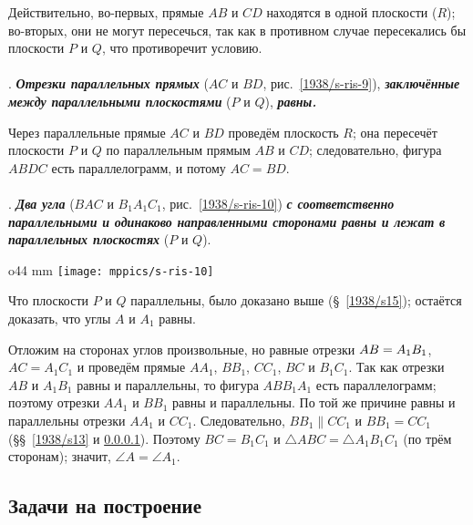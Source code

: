 Действительно, во-первых, прямые $AB$ и $CD$ находятся в одной плоскости ($R$);
во-вторых, они не могут пересечься, так как в противном случае пересекались бы плоскости $P$ и $Q$, что противоречит условию.


\paragraph{}\label{1938/s17} \mbox{.}
\textbf{\emph{Отрезки параллельных прямых}} ($AC$ и $BD$, рис.~\ref{1938/s-ris-9}), \textbf{\emph{заключённые между параллельными плоскостями}} ($P$ и $Q$), \textbf{\emph{равны.}}


Через параллельные прямые $AC$ и $BD$ проведём плоскость $R$;
она пересечёт плоскости $P$ и $Q$ по параллельным прямым $AB$ и $CD$;
следовательно, фигура $ABDC$ есть параллелограмм, и потому $AC = BD$.

\paragraph{}\label{1938/s18}
\mbox{.} \textbf{\emph{Два угла}} ($BAC$ и $B_1A_1C_1$, рис.~\ref{1938/s-ris-10}) \textbf{\emph{с соответственно параллельными и одинаково направленными сторонами равны и лежат в параллельных плоскостях}} ($P$ и $Q$).

\begin{wrapfigure}{o}{44 mm}
\centering
\texttt{[image: mppics/s-ris-10]}
\caption{}\label{1938/s-ris-10}
\end{wrapfigure}

Что плоскости $P$ и $Q$ параллельны, было доказано выше (§~\ref{1938/s15});
остаётся доказать, что углы $A$ и $A_1$ равны.

Отложим на сторонах углов произвольные, но равные отрезки $AB\z=A_1B_1$, $AC=A_1C_1$ и проведём прямые $AA_1$, $BB_1$, $CC_1$, $BC$ и $B_1C_1$.
Так как отрезки $AB$ и $A_1B_1$ равны и параллельны, то фигура $ABB_1A_1$ есть параллелограмм;
поэтому отрезки $AA_1$ и $BB_1$ равны и параллельны.
По той же причине равны и параллельны отрезки $AA_1$ и $CC_1$.
Следовательно, $BB_1\parallel CC_1$ и $BB_1=CC_1$ (§§~\ref{1938/s13} и \ref{1938/s17}).
Поэтому $BC=B_1C_1$ и $\triangle ABC=\triangle A_1B_1C_1$ (по трём сторонам);
значит, $\angle A=\angle A_1$.

\subsection*{Задачи на построение}

